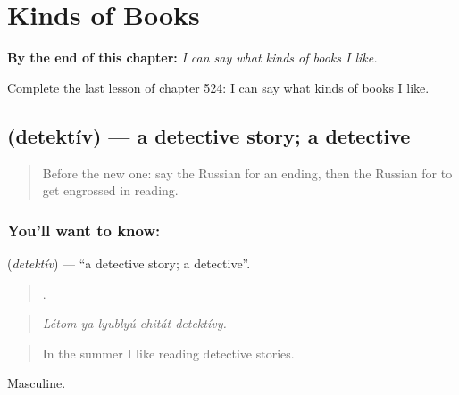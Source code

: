
\chapter{Kinds of Books}
\label{ch:ru-kinds-of-books}

\begin{chapteropening}
\textbf{By the end of this chapter:} \emph{I can say what kinds of books I like.}

Complete the last lesson of chapter 524: I can say what kinds of books I like.
\end{chapteropening}

\section[\texorpdfstring{\ru{детектив} (detektív)}{детектив (detektív)}]{ (detektív) — a detective story; a detective}

\label{lesson:RU-C524-detektiv}



\begin{quote}
Before the new one: say the Russian for an ending, then the Russian for to get engrossed in reading.
\end{quote}

\subsection*{You'll want to know: }
\textbf{} (\emph{detektív}) — \textquotedblleft{}a detective story; a detective\textquotedblright{}.

\begin{quote}
    .
\end{quote}

\begin{quote}
\emph{Létom ya lyublyú chitát detektívy.}
\end{quote}

\begin{quote}
In the summer I like reading detective stories.
\end{quote}

Masculine.

